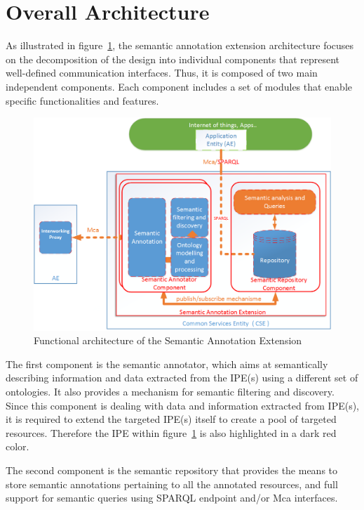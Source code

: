 \section{Overall Architecture}

As illustrated in figure~\ref{fig:contrib2:2}, the semantic annotation extension architecture focuses on the decomposition of the design into individual components that represent well-defined communication interfaces. Thus, it is composed of two main independent components. Each component includes a set of modules that enable specific functionalities and features. \par
\begin{figure}[htbp]
    \centering
    \includegraphics[width=1\textwidth]{resources/images/archi}
    \caption{Functional architecture of the Semantic Annotation Extension }\label{fig:contrib2:2}
\end{figure}
The first component is the semantic annotator, which aims at semantically describing information and data extracted from the IPE(s) using a different set of ontologies. It also provides a mechanism for semantic filtering and discovery. Since this component is dealing with data and information extracted from IPE(s), it is required to extend the targeted IPE(s) itself to create a pool of targeted resources. Therefore the IPE within figure~\ref{fig:contrib2:2} is also highlighted in a dark red color.\par
The second component is the semantic repository that provides the means to store semantic annotations pertaining to all the annotated resources, and full support for semantic queries using SPARQL endpoint and/or Mca interfaces. \par
